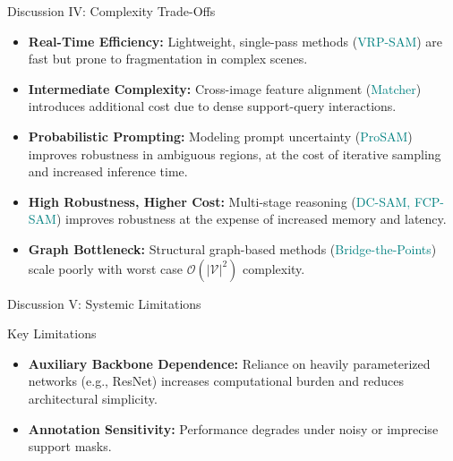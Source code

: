 \documentclass[aspectratio=169, 10pt]{beamer}
\begin{document}
\begin{frame}{Discussion IV: Complexity Trade-Offs}
\begin{itemize}
\item \textbf{Real-Time Efficiency:} Lightweight, single-pass methods (\textcolor{teal}{VRP-SAM}) are fast but prone to fragmentation in complex scenes.

    \item \textbf{Intermediate Complexity:} Cross-image feature alignment (\textcolor{teal}{Matcher}) introduces additional cost due to dense support-query interactions.
    
    \item \textbf{Probabilistic Prompting:} Modeling prompt uncertainty (\textcolor{teal}{ProSAM}) improves robustness in ambiguous regions, at the cost of iterative sampling and increased inference time.
    
    \item \textbf{High Robustness, Higher Cost:} Multi-stage reasoning (\textcolor{teal}{DC-SAM, FCP-SAM}) improves robustness at the expense of increased memory and latency.
    
    \item \textbf{Graph Bottleneck:} Structural graph-based methods (\textcolor{teal}{Bridge-the-Points}) scale poorly with worst case $\mathcal{O}(|\mathcal{V}|^2)$ complexity.
\end{itemize}

\end{frame}

\begin{frame}{Discussion V: Systemic Limitations}
    \begin{alertblock}{Key Limitations}
        \begin{itemize}
            \item \textbf{Auxiliary Backbone Dependence:} Reliance on heavily parameterized networks (e.g., ResNet) increases computational burden and reduces architectural simplicity.
            
            \item \textbf{Annotation Sensitivity:} Performance degrades under noisy or imprecise support masks.
        \end{itemize}
    \end{alertblock}
\end{frame}

\end{document}
